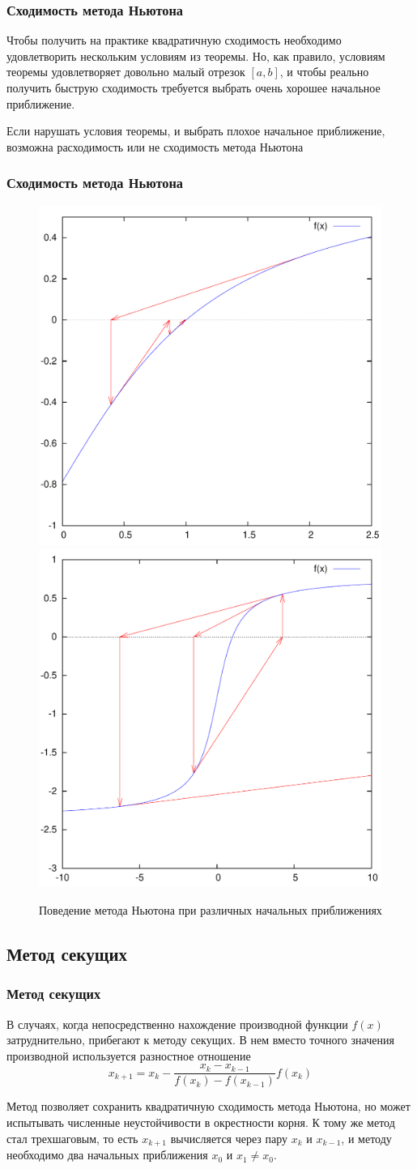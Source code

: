 \documentclass[apectratio=43,unicode]{beamer}
\begin{document}
\begin{frame}
\frametitle{Сходимость метода Ньютона}
	Чтобы получить на практике квадратичную сходимость необходимо удовлетворить нескольким условиям из теоремы.
	Но, как правило, условиям теоремы удовлетворяет довольно малый отрезок $[a,b]$, и чтобы реально получить быструю сходимость
	требуется выбрать очень хорошее начальное приближение.

	Если нарушать условия теоремы, и выбрать плохое начальное приближение, возможна расходимость или не сходимость метода Ньютона
\end{frame}

\begin{frame}
\frametitle{Сходимость метода Ньютона}
	\begin{figure}%
	\includegraphics[width=0.5\columnwidth]{nw.pdf}%
	\includegraphics[width=0.5\columnwidth]{nw2.pdf}%
	\caption{Поведение метода Ньютона при различных начальных приближениях}%
	\end{figure}
\end{frame}

\subsection{Метод секущих}
\begin{frame}
\frametitle{Метод секущих}
	В случаях, когда непосредственно нахождение производной функции $f(x)$ затруднительно, прибегают к методу секущих.
	В нем вместо точного значения производной используется разностное отношение
	\[
	x_{k+1} = x_k - \frac{x_k - x_{k-1}}{f(x_k) - f(x_{k-1})} f(x_k)
	\]

	Метод позволяет сохранить квадратичную сходимость метода Ньютона, но может испытывать численные неустойчивости в окрестности корня.
	К тому же метод стал трехшаговым, то есть $x_{k+1}$ вычисляется через пару $x_k$ и $x_{k-1}$, и методу необходимо два начальных приближения $x_0$ и $x_1 \neq x_0$.
\end{frame}
\end{document}
